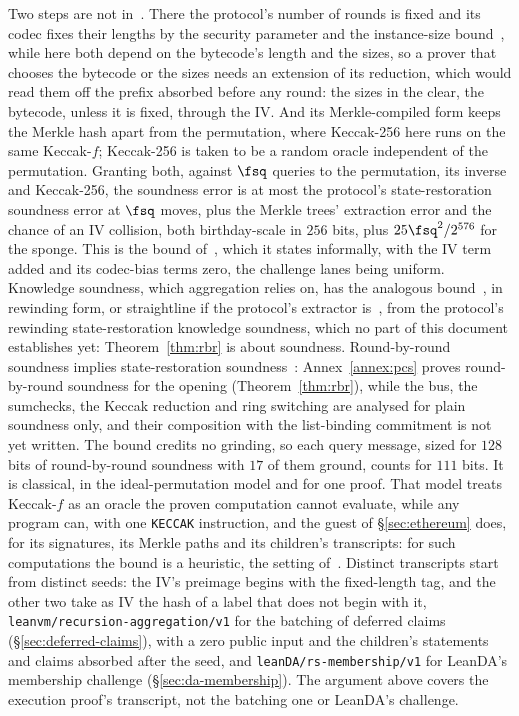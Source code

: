 Two steps are not in~\cite{CO25}. There the protocol's number of rounds is fixed and its codec fixes their lengths by the security parameter and the instance-size bound~\cite[Definition~4.1]{CO25}, while here both depend on the bytecode's length and the sizes, so a prover that chooses the bytecode or the sizes needs an extension of its reduction, which would read them off the prefix absorbed before any round: the sizes in the clear, the bytecode, unless it is fixed, through the IV. And its Merkle-compiled form keeps the Merkle hash apart from the permutation, where Keccak-256 here runs on the same Keccak-$f$; Keccak-256 is taken to be a random oracle independent of the permutation. Granting both, against $\fsq$ queries to the permutation, its inverse and Keccak-256, the soundness error is at most the protocol's state-restoration soundness error at $\fsq$ moves, plus the Merkle trees' extraction error and the chance of an IV collision, both birthday-scale in $256$ bits, plus $25\fsq^2/2^{576}$ for the sponge. This is the bound of~\cite[\S2.6, Corollary~1]{CO25}, which it states informally, with the IV term added and its codec-bias terms zero, the challenge lanes being uniform. Knowledge soundness, which aggregation relies on, has the analogous bound~\cite[\S2.6, Corollary~1]{CO25}, in rewinding form, or straightline if the protocol's extractor is~\cite[Theorem~6.2]{CO25}, from the protocol's rewinding state-restoration knowledge soundness, which no part of this document establishes yet: Theorem~\ref{thm:rbr} is about soundness. Round-by-round soundness implies state-restoration soundness~\cite{CY24}: Annex~\ref{annex:pcs} proves round-by-round soundness for the opening (Theorem~\ref{thm:rbr}), while the bus, the sumchecks, the Keccak reduction and ring switching are analysed for plain soundness only, and their composition with the list-binding commitment is not yet written. The bound credits no grinding, so each query message, sized for $128$ bits of round-by-round soundness with $17$ of them ground, counts for $111$ bits. It is classical, in the ideal-permutation model and for one proof. That model treats Keccak-$f$ as an oracle the proven computation cannot evaluate, while any program can, with one \texttt{KECCAK} instruction, and the guest of \S\ref{sec:ethereum} does, for its signatures, its Merkle paths and its children's transcripts: for such computations the bound is a heuristic, the setting of~\cite{KRS25}. Distinct transcripts start from distinct seeds: the IV's preimage begins with the fixed-length tag, and the other two take as IV the hash of a label that does not begin with it, \texttt{leanvm/recursion-aggregation/v1} for the batching of deferred claims (\S\ref{sec:deferred-claims}), with a zero public input and the children's statements and claims absorbed after the seed, and \texttt{leanDA/rs-membership/v1} for LeanDA's membership challenge (\S\ref{sec:da-membership}). The argument above covers the execution proof's transcript, not the batching one or LeanDA's challenge.

